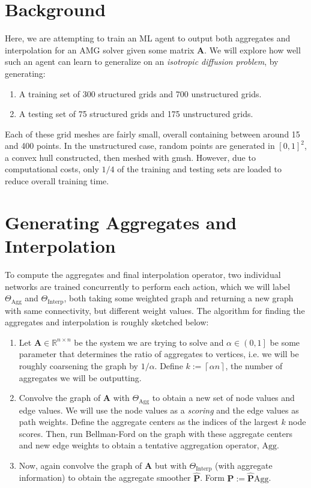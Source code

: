 \documentclass{article}
\newcommand{\mat}[1]{\bm{{#1}}}
\newcommand{\ceil}[1]{\left\lceil #1 \right\rceil}
\begin{document}
\section{Background}
Here, we are attempting to train an ML agent to output both aggregates and interpolation for an AMG solver given some matrix $\mat{A}$.  We will explore how well such an agent can learn to generalize on an \textit{isotropic diffusion problem}, by generating:
\begin{enumerate}
\item A training set of 300 structured grids and 700 unstructured grids.
\item A testing set of 75 structured grids and 175 unstructured grids.
\end{enumerate}
Each of these grid meshes are fairly small, overall containing between around 15 and 400 points.  In the unstructured case, random points are generated in $\left[0,1\right]^2$, a convex hull constructed, then meshed with gmsh.  However, due to computational costs, only $1/4$ of the training and testing sets are loaded to reduce overall training time.

\section{Generating Aggregates and Interpolation}
To compute the aggregates and final interpolation operator, two individual networks are trained concurrently to perform each action, which we will label $\Theta_{\text{Agg}}$ and $\Theta_{\text{Interp}}$, both taking some weighted graph and returning a new graph with same connectivity, but different weight values.  The algorithm for finding the aggregates and interpolation is roughly sketched below:
\begin{enumerate}
\item Let $\mat{A} \in \mathbb{R}^{n \times n}$ be the system we are trying to solve and $\alpha \in \left(0, 1\right]$ be some parameter that determines the ratio of aggregates to vertices, i.e. we will be roughly coarsening the graph by $1/\alpha$.  Define $k := \ceil{\alpha n}$, the number of aggregates we will be outputting.
\item Convolve the graph of $\mat{A}$ with $\Theta_{\text{Agg}}$ to obtain a new set of node values and edge values.  We will use the node values as a \textit{scoring} and the edge values as path weights.  Define the aggregate centers as the indices of the largest $k$ node scores.  Then, run Bellman-Ford on the graph with these aggregate centers and new edge weights to obtain a tentative aggregation operator, $\text{Agg}$.
\item Now, again convolve the graph of $\mat{A}$ but with $\Theta_{\text{Interp}}$ (with aggregate information) to obtain the aggregate smoother $\mat{\hat{P}}$.  Form $\mat{P} := \mat{\hat{P}}\text{Agg}$.
\end{enumerate}
\end{document}
